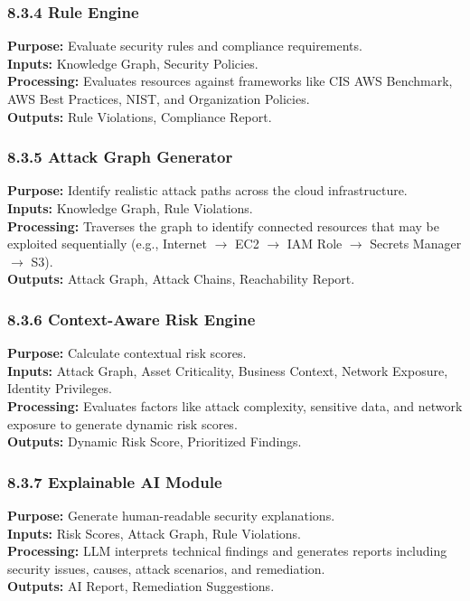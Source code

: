 \subsubsection{8.3.4 Rule Engine}

\textbf{Purpose:} Evaluate security rules and compliance requirements.\\
\textbf{Inputs:} Knowledge Graph, Security Policies.\\
\textbf{Processing:} Evaluates resources against frameworks like CIS AWS Benchmark, AWS Best Practices, NIST, and Organization Policies.\\
\textbf{Outputs:} Rule Violations, Compliance Report.

\subsubsection{8.3.5 Attack Graph Generator}

\textbf{Purpose:} Identify realistic attack paths across the cloud infrastructure.\\
\textbf{Inputs:} Knowledge Graph, Rule Violations.\\
\textbf{Processing:} Traverses the graph to identify connected resources that may be exploited sequentially (e.g., Internet \(\rightarrow\) EC2 \(\rightarrow\) IAM Role \(\rightarrow\) Secrets Manager \(\rightarrow\) S3).\\
\textbf{Outputs:} Attack Graph, Attack Chains, Reachability Report.

\subsubsection{8.3.6 Context-Aware Risk Engine}

\textbf{Purpose:} Calculate contextual risk scores.\\
\textbf{Inputs:} Attack Graph, Asset Criticality, Business Context, Network Exposure, Identity Privileges.\\
\textbf{Processing:} Evaluates factors like attack complexity, sensitive data, and network exposure to generate dynamic risk scores.\\
\textbf{Outputs:} Dynamic Risk Score, Prioritized Findings.

\subsubsection{8.3.7 Explainable AI Module}

\textbf{Purpose:} Generate human-readable security explanations.\\
\textbf{Inputs:} Risk Scores, Attack Graph, Rule Violations.\\
\textbf{Processing:} LLM interprets technical findings and generates reports including security issues, causes, attack scenarios, and remediation.\\
\textbf{Outputs:} AI Report, Remediation Suggestions.

